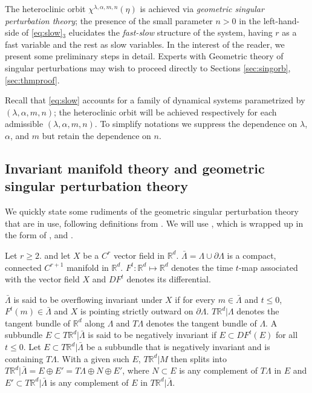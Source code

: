 \documentclass[a4paper,11pt]{article}
\theoremstyle{remark}
\begin{document}
The heteroclinic orbit $\chi^{\lambda,\alpha,m,n}(\eta)$ is achieved via {\it geometric singular perturbation theory}; the presence of the small parameter $n>0$ in the left-hand-side of \eqref{eq:slow}$_3$ elucidates the {\it fast-slow} structure of the system, having $r$ as a fast variable and the rest as slow variables.  
In the interest of the reader, we present some preliminary steps in detail. Experts with Geometric theory of singular
perturbations may wish to proceed directly to Sections \ref{sec:singorb}, \ref{sec:thmproof}. 

Recall that \eqref{eq:slow} accounts for a family of dynamical systems parametrized by $(\lambda,\alpha,m,n)$; the heteroclinic orbit will be achieved respectively for each admissible $(\lambda,\alpha,m,n)$. To simplify notations we suppress the dependence on $\lambda$, $\alpha$, and $m$ but retain
the dependence on $n$.

\subsection{Invariant manifold theory and geometric singular perturbation theory}\label{sec:singpert}
We quickly state some rudiments of the geometric singular perturbation theory that are in use, following definitions from \cite{fenichel_asymptotic_1977,fenichel_geometric_1979}. %
We will use \cite[Theorem 12.2]{fenichel_geometric_1979}, which is wrapped up in the form of \cite[Theorem 2.2]{Sz1991}, and \cite[Theorem 3.1]{Sz1991}.

Let $r\ge2$. and let $X$ be a $C^{r}$ vector field in $\mathbb{R}^d$. $\bar{\Lambda}=\Lambda \cup \partial \Lambda$ is a compact, connected $C^{r+1}$ manifold in $\mathbb{R}^d$. $F^t: \mathbb{R}^d \mapsto \mathbb{R}^d$ denotes the time $t$-map associated with the vector field $X$ and $DF^t$ denotes its differential. 

$\bar{\Lambda}$ is said to be overflowing invariant under $X$ if for every $m\in\bar{\Lambda}$ and $t\le0$, $F^t(m)\in \bar{\Lambda}$ and $X$ is pointing strictly outward on $\partial \Lambda$. $T \mathbb{R}^d|\Lambda$ denotes the tangent bundle of $\mathbb{R}^d$ along $\Lambda$ and $T\Lambda$ denotes the tangent bundle of $\Lambda$. A subbundle $E\subset T\mathbb{R}^d|\bar{\Lambda}$ is said to be negatively invariant if $E\subset DF^t(E)$ for all $t\le0$. Let $E\subset T\mathbb{R}^d|\bar{\Lambda}$ be a subbundle that is negatively invariant and is containing $T\Lambda$. With a given such $E$,  $T \mathbb{R}^d|M$ then splits into $T\mathbb{R}^d|\bar{\Lambda} =E\oplus E'= T\Lambda\oplus N\oplus E'$, where $N\subset E$ is any complement of $T\Lambda$ in $E$ and $E'\subset T\mathbb{R}^d|\bar{\Lambda}$ is any complement of $E$ in $T\mathbb{R}^d|\bar{\Lambda}$.  
\end{document}
